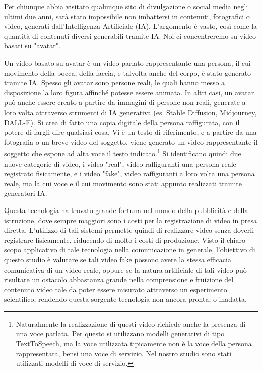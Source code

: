 
Per chiunque abbia visitato qualunque sito di divulgazione o social media negli ultimi due anni, sarà stato impossibile non imbattersi in contenuti, fotografici o video, generati dall'Intelligenza Artificiale (IA). L'argomento è vasto, così come la quantità di contenuti diversi generabili tramite IA. Noi ci concentreremo su video basati su "avatar".

Un video basato su avatar è un video parlato rappresentante una persona, il cui movimento della bocca, della faccia, e talvolta anche del corpo, è stato generato tramite IA. Spesso gli avatar sono persone reali, le quali hanno messo a disposizione la loro figura affinché potesse essere animata. In altri casi, un avatar può anche essere creato a partire da immagini di persone non reali, generate a loro volta attraverso strumenti di IA generativa (es. Stable Diffusion, Midjourney, DALL-E). Si crea di fatto una copia digitale della persona raffigurata, con il potere di fargli dire qualsiasi cosa. Vi è un testo di riferimento, e a partire da una fotografia o un breve video del soggetto, viene generato un video rappresentante il soggetto che espone ad alta voce il testo indicato.\footnote{Naturalmente la realizzazione di questi video richiede anche la presenza di una voce parlata. Per questo si utilizzano modelli generativi di tipo TextToSpeech, ma la voce utilizzata tipicamente non è la voce della persona rappresentata, bensì una voce di servizio. Nel nostro studio sono stati utilizzati modelli di voce di servizio.} Si identificano quindi due nuove categorie di video, i video "real", video raffiguranti una persona reale registrato fisicamente, e i video "fake", video raffiguranti a loro volta una persona reale, ma la cui voce e il cui movimento sono stati appunto realizzati tramite generatori IA.

Questa tecnologia ha trovato grande fortuna nel mondo della pubblicità e della istruzione, dove sempre maggiori sono i costi per la registrazione di video in presa diretta. L'utilizzo di tali sistemi permette quindi di realizzare video senza doverli registrare fisicamente, riducendo di molto i costi di produzione. Visto il chiaro scopo applicativo di tale tecnologia nella comunicazione in generale, l'obiettivo di questo studio è valutare se tali video fake possono avere la stessa efficacia comunicativa di un video reale, oppure se la natura artificiale di tali video può risultare un ostacolo abbastanza grande nella comprensione e fruizione del contenuto video tale da poter essere misurato attraverso un esperimento scientifico, rendendo questa sorgente tecnologia non ancora pronta, o inadatta. 

